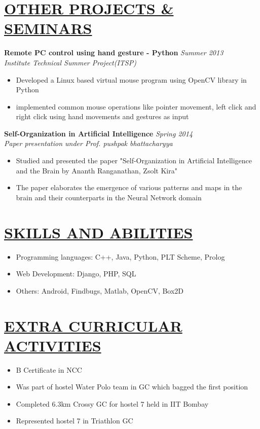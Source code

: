 \documentclass[11pt]{res}
\begin{document}
\begin{resume}
\vspace{-10pt}
\section{\underline{OTHER PROJECTS \& SEMINARS}}
\vspace{3pt}
\textbf{Remote PC control using hand gesture - Python} \hfill \emph{Summer 2013}\\
\textsl{Institute Technical Summer Project(ITSP)}\hfill  
\begin{itemize} \itemsep -2pt
\item Developed a Linux based virtual mouse program using OpenCV library in Python
\item implemented common mouse operations like pointer movement, left click and right click using hand movements and gestures as input
\end{itemize}

\vspace{-10pt}
\textbf{Self-Organization in Artificial Intelligence} \hfill \emph{Spring 2014}\\
\textsl{Paper presentation under Prof. pushpak bhattacharyya}\hfill  
\begin{itemize} \itemsep -2pt
\item Studied and presented the paper "Self-Organization in Artificial Intelligence and the Brain by Ananth Ranganathan, Zsolt Kira"
\item The paper elaborates the emergence of various patterns and maps in the brain and their counterparts in the Neural Network domain
\end{itemize}

\vspace{-6pt}
\section{\underline{SKILLS AND ABILITIES}}
\vspace{3pt}
\begin{itemize} \itemsep -2pt
\item Programming languages: C++, Java, Python, PLT Scheme, Prolog
\item Web Development: Django, PHP, SQL 
\item Others: Android, Findbugs, Matlab, OpenCV, Box2D
\end{itemize} 

\vspace{-6pt}
\section{\underline{EXTRA CURRICULAR ACTIVITIES}}
\vspace{3pt}
\begin{itemize} \itemsep -2pt
\item B Certificate in NCC
\item Was part of hostel Water Polo team in GC which bagged the first position
\item Completed 6.3km Crossy GC for hostel 7 held in IIT Bombay
\item Represented hostel 7 in Triathlon GC
\end{itemize} 

\end{resume} 
\end{document}

